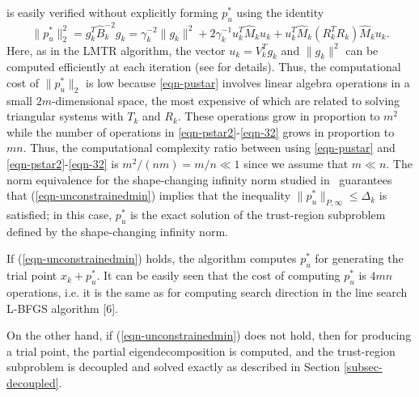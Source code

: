 is easily verified without explicitly forming $p_u^*$ 
using the identity
\begin{equation}\label{eqn-pustar}
\|p_u^*\|_2^2 = g_k^T \hat{B}_k^{-2} g_k = 
\gamma_k^{-2}\|g_k\|^2 + 2\gamma_k^{-1} u_k^T \hat{M}_k u_k + u_k^T \hat{M}_k (R_k^T R_k) \hat{M}_k u_k.
\end{equation}
Here, as in the LMTR algorithm, the vector $u_k = V_k^T g_k$ 
and $\| g_k \|^2$ can be computed efficiently at each iteration
(see \cite{BurdakovLMTR16} for details).
Thus, the computational cost of $\|p_u^*\|_2$ is low because 
\eqref{eqn-pustar} involves linear algebra operations in a small $2m$-dimensional space,
the most expensive of which are related to solving triangular systems with $T_k$ and $R_k$.
These operations grow in proportion to $m^2$ while the number of operations in 
\eqref{eqn-pstar2}-\eqref{eqn-32} grows in proportion to $mn$. Thus, the 
computational complexity ratio between using \eqref{eqn-pustar}  and
\eqref{eqn-pstar2}-\eqref{eqn-32} is  $m^2/(nm) = m/n \ll 1$ since we assume that $m \ll n$.
The norm
equivalence for the shape-changing infinity norm studied
in~\cite{BurdakovLMTR16} guarantees that (\ref{eqn-unconstrainedmin})
implies that the inequality $\|p_u^*\|_{P,\infty} \le \Delta_k$ is
satisfied; in this case, $p_u^*$ is the exact solution of the
trust-region subproblem defined by the shape-changing infinity
norm. 


If (\ref{eqn-unconstrainedmin}) holds, the algorithm computes
$p_u^*$ for generating the trial point $x_k + p_u^*$.   It can be
easily seen that the cost of computing $p_u^*$ is $4mn$ operations,
i.e. it is the same as for computing search direction in the line
search L-BFGS algorithm [6].

On the other hand, if (\ref{eqn-unconstrainedmin})
does not hold, then for producing a trial point, the partial
eigendecomposition is computed, and the trust-region subproblem is
decoupled and solved exactly as described in Section \ref{subsec-decoupled}.






